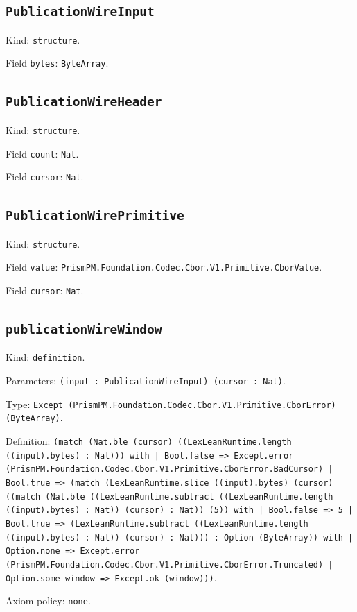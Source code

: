 \documentclass[11pt]{article}
\begin{document}
\subsection*{\texttt{PublicationWireInput}}
\noindent Kind: \texttt{structure}.\par
\noindent Field \texttt{bytes}: \texttt{ByteArray}.\par
\subsection*{\texttt{PublicationWireHeader}}
\noindent Kind: \texttt{structure}.\par
\noindent Field \texttt{count}: \texttt{Nat}.\par
\noindent Field \texttt{cursor}: \texttt{Nat}.\par
\subsection*{\texttt{PublicationWirePrimitive}}
\noindent Kind: \texttt{structure}.\par
\noindent Field \texttt{value}: \texttt{PrismPM.Foundation.Codec.Cbor.V1.Primitive.CborValue}.\par
\noindent Field \texttt{cursor}: \texttt{Nat}.\par
\subsection*{\texttt{publicationWireWindow}}
\noindent Kind: \texttt{definition}.\par
\noindent Parameters: \texttt{(input : PublicationWireInput) (cursor : Nat)}.\par
\noindent Type: \texttt{Except (PrismPM.Foundation.Codec.Cbor.V1.Primitive.CborError) (ByteArray)}.\par
\noindent Definition: \texttt{(match (Nat.ble (cursor) ((LexLeanRuntime.length ((input).bytes) : Nat))) with | Bool.false => Except.error (PrismPM.Foundation.Codec.Cbor.V1.Primitive.CborError.BadCursor) | Bool.true => (match (LexLeanRuntime.slice ((input).bytes) (cursor) ((match (Nat.ble ((LexLeanRuntime.subtract ((LexLeanRuntime.length ((input).bytes) : Nat)) (cursor) : Nat)) (5)) with | Bool.false => 5 | Bool.true => (LexLeanRuntime.subtract ((LexLeanRuntime.length ((input).bytes) : Nat)) (cursor) : Nat))) : Option (ByteArray)) with | Option.none => Except.error (PrismPM.Foundation.Codec.Cbor.V1.Primitive.CborError.Truncated) | Option.some window => Except.ok (window)))}.\par
\noindent Axiom policy: \texttt{none}.\par
\end{document}
